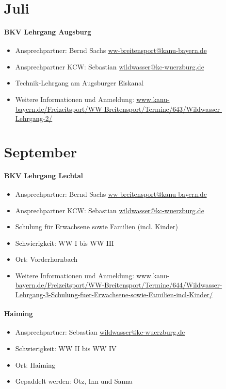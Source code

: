 \documentclass[12pt, a4paper]{report}
\begin{document}
\section*{Juli}\paragraph{BKV Lehrgang Augsburg}
\begin{itemize}
    \item Ansprechpartner: Bernd Sachs \href{mailto:ww-breitensport@kanu-bayern.de}{ww-breitensport@kanu-bayern.de}
    \item Ansprechpartner KCW: Sebastian \href{mailto:wildwasser@kc-wuerzburg.de}{wildwasser@kc-wuerzburg.de}
    \item Technik-Lehrgang am Augsburger Eiskanal
    \item Weitere Informationen und Anmeldung: \url{www.kanu-bayern.de/Freizeitsport/WW-Breitensport/Termine/643/Wildwasser-Lehrgang-2/}
\end{itemize}

\section*{September}\paragraph{BKV Lehrgang Lechtal}
\begin{itemize}
    \item Ansprechpartner: Bernd Sachs \href{mailto:ww-breitensport@kanu-bayern.de}{ww-breitensport@kanu-bayern.de}
    \item Ansprechpartner KCW: Sebastian \href{mailto:wildwasser@kc-wuerzburg.de}{wildwasser@kc-wuerzburg.de}
    \item Schulung für Erwachsene sowie Familien (incl. Kinder)
    \item Schwierigkeit: WW I bis WW III
    \item Ort: Vorderhornbach
    \item Weitere Informationen und Anmeldung: \url{www.kanu-bayern.de/Freizeitsport/WW-Breitensport/Termine/644/Wildwasser-Lehrgang-3-Schulung-fuer-Erwachsene-sowie-Familien-incl-Kinder/}
\end{itemize}

\paragraph{Haiming}
\begin{itemize}
    \item Ansprechpartner: Sebastian \href{mailto:wildwasser@kc-wuerzburg.de}{wildwasser@kc-wuerzburg.de}
    \item Schwierigkeit: WW II bis WW IV
    \item Ort: Haiming
    \item Gepaddelt werden: Ötz, Inn und Sanna
\end{itemize}
\end{document}
